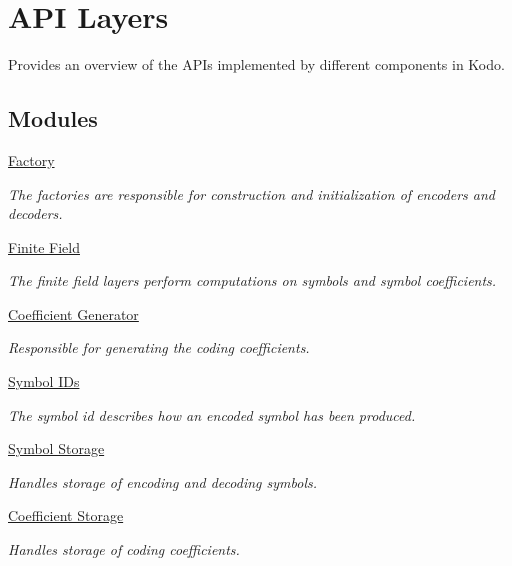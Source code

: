 \hypertarget{group__api__layer}{\section{A\-P\-I Layers}
\label{group__api__layer}
}


Provides an overview of the A\-P\-Is implemented by different components in Kodo.  


\subsection*{Modules}
\begin{DoxyCompactItemize}
\item 
\hyperlink{group__factory}{Factory}
\begin{DoxyCompactList}\small\item\em The factories are responsible for construction and initialization of encoders and decoders. \end{DoxyCompactList}\item 
\hyperlink{group__finite__field}{Finite Field}
\begin{DoxyCompactList}\small\item\em The finite field layers perform computations on symbols and symbol coefficients. \end{DoxyCompactList}\item 
\hyperlink{group__coefficient__generator}{Coefficient Generator}
\begin{DoxyCompactList}\small\item\em Responsible for generating the coding coefficients. \end{DoxyCompactList}\item 
\hyperlink{group__symbol__id}{Symbol I\-Ds}
\begin{DoxyCompactList}\small\item\em The symbol id describes how an encoded symbol has been produced. \end{DoxyCompactList}\item 
\hyperlink{group__symbol__storage}{Symbol Storage}
\begin{DoxyCompactList}\small\item\em Handles storage of encoding and decoding symbols. \end{DoxyCompactList}\item 
\hyperlink{group__coefficient__storage}{Coefficient Storage}
\begin{DoxyCompactList}\small\item\em Handles storage of coding coefficients. \end{DoxyCompactList}\item 

\end{DoxyCompactItemize}
